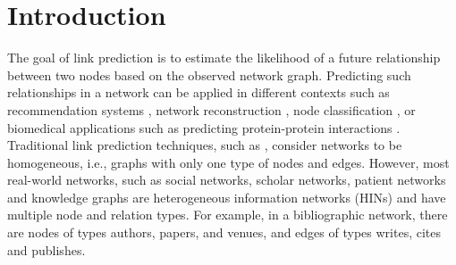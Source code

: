 \section{Introduction}
\label{Sec:Introduction}


The goal of link prediction \cite{liben2007link} is to estimate the likelihood of a future relationship between two nodes based on the observed network graph. Predicting such relationships in a network %
can be applied in different contexts such as recommendation systems 
\cite{chen2005link,song2009scalable,lu2012recommender,li2013recommendation,guy2015social}, network reconstruction \cite{guimera2009missing}, node classification \cite{gallagher2008using}, or biomedical applications such as predicting protein-protein interactions \cite{lei2012novel}. Traditional link prediction techniques, such as \cite{liben2007link}, consider networks to be homogeneous, i.e., graphs with only one type of nodes and edges. However, most real-world networks, such as social networks, scholar networks, patient networks \cite{denny2012mining} and knowledge graphs \cite{wang2015incorporating} are heterogeneous information networks (HINs) \cite{shi2017survey} and have multiple node and relation types. For example, in a bibliographic network, there are nodes of types authors, papers, and venues, and edges of types writes, cites and publishes.

